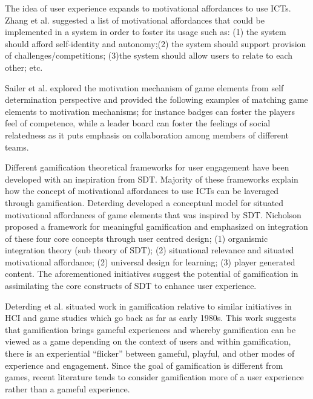 \documentclass{sig-alternate}
\begin{document}
The idea of user experience expands to motivational affordances to use ICTs. Zhang et al.\cite{zhang2008:motivational} suggested a list of motivational affordances that could be implemented in a system in order to foster its usage such as: (1) the system should afford self-identity and autonomy;(2) the system should support provision of challenges/competitions; (3)the system should allow users to relate to each other; etc.

Sailer et al.\cite{sailer2013:psychological} explored the motivation mechanism of game elements from self determination perspective and provided the following examples of matching game elements to motivation mechanisms; for instance badges can foster the players feel of competence, while a leader board can foster the feelings of social relatedness as it puts emphasis on collaboration among members of different teams.

Different gamification theoretical frameworks for user engagement have been developed with an inspiration from SDT. Majority of these frameworks explain how the concept of motivational affordances to use ICTs can be laveraged through gamification. Deterding \cite{deterding2011:situated} developed  a conceptual model for situated motivational affordances of game elements that was inspired by SDT. Nicholson \cite{nicholson2012:user} proposed a framework for meaningful gamification and emphasized on integration of these four core concepts through user centred design; (1) organismic integration theory (sub theory of SDT); (2) situational relevance and situated motivational affordance; (2) universal design for learning; (3) player generated content. The aforementioned initiatives suggest the potential of gamification in assimilating the core constructs of SDT to enhance user experience.

Deterding et al. \cite{deterding2011game} situated work in gamification relative to similar initiatives in HCI and game studies which go back as far as early 1980s. This work suggests that gamification brings gameful experiences and whereby gamification can be viewed as a game depending on the context of users and within gamification, there is an experiential ``flicker'' between gameful, playful, and other modes of experience and engagement. Since the goal of gamification is different from games, recent literature  tends to consider gamification more of a user experience rather than a gameful experience\cite{seaborn2015:gamification}.
\end{document}
